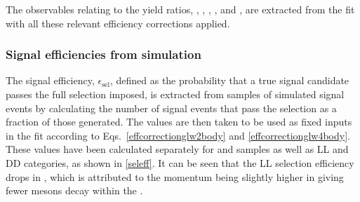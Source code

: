 The \CP observables relating to the yield ratios, \Rkk, \Rpipi, \Rptwo,  \Rmtwo \Rpipipipi, \Rpfour and  \Rmfour, are extracted from the \CP fit with all these relevant efficiency corrections applied.

\subsubsection{Signal efficiencies from simulation}
\label{sec:cpfit:efficiencies:signal}

The signal efficiency, $\epsilon_{\text{sel}}$, defined as the probability that a true signal candidate passes the full selection imposed, is extracted from samples of simulated signal events by calculating the number of signal events that pass the selection as a fraction of those generated. The values are then taken to be used as fixed inputs in the \CP fit according to Eqs.~\ref{effcorrectionglw2body} and \ref{effcorrectionglw4body}. These values have been calculated separately for \runone and \runtwo samples as well as LL and DD categories, as shown in \tab\ref{seleff}. It can be seen that the LL selection efficiency drops in \runtwo, which is attributed to the \KS momentum being slightly higher in \runtwo giving fewer \KS mesons decay within the \velo. 

\begin{table}[h]
\centering
{}
\caption{Summary of the selection efficiencies used in the \CP fit.}
\label{seleff}
\end{table}

